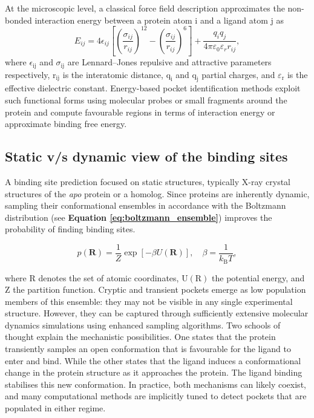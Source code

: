 \documentclass[12pt]{article}
\begin{document}
At the microscopic level, a classical force field description approximates the non-bonded interaction energy between a protein atom i and a ligand atom j as
\begin{equation}
E_{ij} = 4\epsilon_{ij} \left[ \left(\frac{\sigma_{ij}}{r_{ij}} \right)^{12} - \left( \frac{\sigma_{ij}}{r_{ij}} \right)^6 \right] + \frac{q_i q_j}{4\pi \varepsilon_0 \varepsilon_r r_{ij}},
\label{eq:lj_coulomb}
\end{equation}
where $\epsilon_{\textrm{ij}}$ and $\sigma_{\textrm{ij}}$ are Lennard--Jones repulsive and attractive parameters respectively, $\textrm{r}_{\textrm{ij}}$ is the interatomic distance, $\textrm{q}_\textrm{i}$ and $\textrm{q}_\textrm{j}$ partial charges, and $\varepsilon_\textrm{r}$ is the effective dielectric constant. Energy-based pocket identification methods exploit such functional forms using molecular probes or small fragments around the protein and compute favourable regions in terms of interaction energy or approximate binding free energy.\cite{CH5_Ngan2012,CH5_Halgren2009}

\subsection{Static v/s dynamic view of the binding sites}

A binding site prediction focused on static structures, typically X-ray crystal structures of the \emph{apo} protein or a homolog. Since proteins are inherently dynamic, sampling their conformational ensembles in accordance with the Boltzmann distribution (see \textbf{Equation \ref{eq:boltzmann_ensemble}}) improves the probability of finding binding sites.

\begin{equation}
p(\mathbf{R}) = \frac{1}{Z} \exp \left[ - \beta U(\mathbf{R}) \right], \quad \beta = \frac{1}{k_{\mathrm{B}} T},
\label{eq:boltzmann_ensemble}
\end{equation}

where R denotes the set of atomic coordinates, $\textrm{U}(\textrm{R})$ the potential energy, and Z the partition function. Cryptic and transient pockets emerge as low population members of this ensemble: they may not be visible in any single experimental structure. However, they can be captured through sufficiently extensive molecular dynamics simulations using enhanced sampling algorithms\cite{CH5_Kuzmanic2020,CH5_Gasparikova2025}. Two schools of thought explain the mechanistic possibilities. One states that the protein transiently samples an open conformation that is favourable for the ligand to enter and bind. While the other states that the ligand induces a conformational change in the protein structure as it approaches the protein. The ligand binding stabilises this new conformation. In practice, both mechanisms can likely coexist, and many computational methods are implicitly tuned to detect pockets that are populated in either regime.
\end{document}
